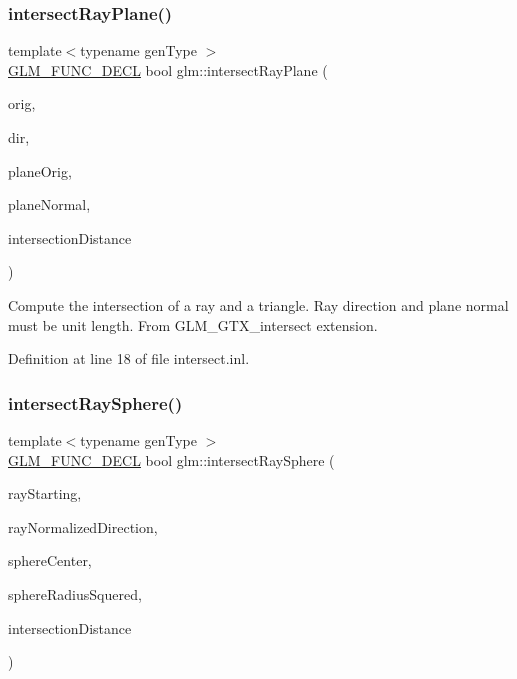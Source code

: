 \subsubsection{\texorpdfstring{intersect\+Ray\+Plane()}{intersectRayPlane()}}
{\footnotesize\ttfamily template$<$typename gen\+Type $>$ \\
\hyperlink{setup_8hpp_ab2d052de21a70539923e9bcbf6e83a51}{G\+L\+M\+\_\+\+F\+U\+N\+C\+\_\+\+D\+E\+CL} bool glm\+::intersect\+Ray\+Plane (\begin{DoxyParamCaption}\item[{gen\+Type const \&}]{orig,  }\item[{gen\+Type const \&}]{dir,  }\item[{gen\+Type const \&}]{plane\+Orig,  }\item[{gen\+Type const \&}]{plane\+Normal,  }\item[{typename gen\+Type\+::value\+\_\+type \&}]{intersection\+Distance }\end{DoxyParamCaption})}

Compute the intersection of a ray and a triangle. Ray direction and plane normal must be unit length. From G\+L\+M\+\_\+\+G\+T\+X\+\_\+intersect extension. 

Definition at line 18 of file intersect.\+inl.

\mbox{\label{group__gtx__intersect_gac88f8cd84c4bcb5b947d56acbbcfa56e}} 
\subsubsection{\texorpdfstring{intersect\+Ray\+Sphere()}{intersectRaySphere()}\hspace{0.1cm}{\footnotesize\ttfamily [1/2]}}
{\footnotesize\ttfamily template$<$typename gen\+Type $>$ \\
\hyperlink{setup_8hpp_ab2d052de21a70539923e9bcbf6e83a51}{G\+L\+M\+\_\+\+F\+U\+N\+C\+\_\+\+D\+E\+CL} bool glm\+::intersect\+Ray\+Sphere (\begin{DoxyParamCaption}\item[{gen\+Type const \&}]{ray\+Starting,  }\item[{gen\+Type const \&}]{ray\+Normalized\+Direction,  }\item[{gen\+Type const \&}]{sphere\+Center,  }\item[{typename gen\+Type\+::value\+\_\+type const}]{sphere\+Radius\+Squered,  }\item[{typename gen\+Type\+::value\+\_\+type \&}]{intersection\+Distance }\end{DoxyParamCaption})}


